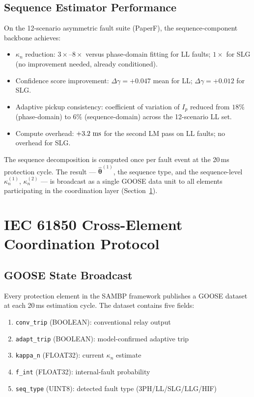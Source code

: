 \subsection{Sequence Estimator Performance}

On the 12-scenario asymmetric fault suite (PaperF), the sequence-component
backbone achieves:
\begin{itemize}
  \item $\kappa_n$ reduction: $3\times$--$8\times$ versus phase-domain fitting
    for LL faults; $1\times$ for SLG (no improvement needed, already conditioned).
  \item Confidence score improvement: $\Delta\gamma = +0.047$ mean for LL;
    $\Delta\gamma = +0.012$ for SLG.
  \item Adaptive pickup consistency: coefficient of variation of $I_p$
    reduced from $18\%$ (phase-domain) to $6\%$ (sequence-domain) across
    the 12-scenario LL set.
  \item Compute overhead: $+3.2\,\,\mathrm{ms}$ for the second LM pass on LL faults;
    no overhead for SLG.
\end{itemize}

The sequence decomposition is computed once per fault event at the 20\,ms
protection cycle.  The result — $\hat{\bm{\theta}}^{(1)}$, the sequence
type, and the sequence-level $\kappa_n^{(1)}$, $\kappa_n^{(2)}$ — is
broadcast as a single GOOSE data unit to all elements participating in
the coordination layer (Section~\ref{sec:ch7_coord}).

\section{IEC 61850 Cross-Element Coordination Protocol}
\label{sec:ch7_coord}

\subsection{GOOSE State Broadcast}

Every protection element in the SAMBP framework publishes a GOOSE dataset
at each 20\,ms estimation cycle.  The dataset contains five fields:
\begin{enumerate}
  \item \texttt{conv\_trip} (BOOLEAN): conventional relay output
  \item \texttt{adapt\_trip} (BOOLEAN): model-confirmed adaptive trip
  \item \texttt{kappa\_n} (FLOAT32): current $\kappa_n$ estimate
  \item \texttt{f\_int} (FLOAT32): internal-fault probability
  \item \texttt{seq\_type} (UINT8): detected fault type (3PH/LL/SLG/LLG/HIF)
\end{enumerate}

